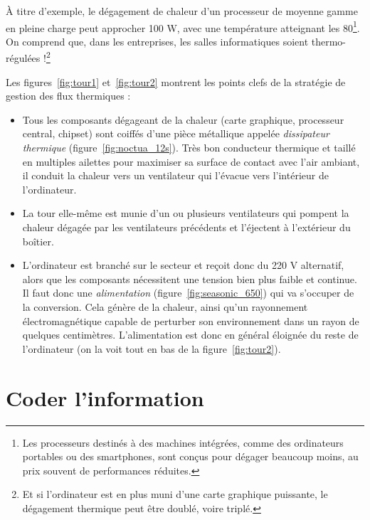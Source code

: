 À titre d'exemple, le dégagement de chaleur d'un processeur de moyenne gamme en pleine charge peut approcher 100 W, avec une température atteignant les 80\degre\footnote{Les processeurs destinés à des machines intégrées, comme des ordinateurs portables ou des smartphones, sont conçus pour dégager beaucoup moins, au prix souvent de performances réduites.}. On comprend que, dans les entreprises, les salles informatiques soient thermo-régulées !\footnote{Et si l'ordinateur est en plus muni d'une carte graphique puissante, le dégagement thermique peut être doublé, voire triplé.}

Les figures~\ref{fig:tour1} et~\ref{fig:tour2} montrent les points clefs de la stratégie de gestion des flux thermiques :
\begin{itemize}
	\item Tous les composants dégageant de la chaleur (carte graphique, processeur central, chipset) sont coiffés d'une pièce métallique appelée \emph{dissipateur thermique} (figure~\ref{fig:noctua_12s}). Très bon conducteur thermique et taillé en multiples ailettes pour maximiser sa surface de contact avec l'air ambiant, il conduit la chaleur vers un ventilateur qui l'évacue vers l'intérieur de l'ordinateur.
	\item La tour elle-même est munie d'un ou plusieurs ventilateurs qui pompent la chaleur dégagée par les ventilateurs précédents et l'éjectent à l'extérieur du boîtier.	\item L'ordinateur est branché sur le secteur et reçoit donc du 220 V alternatif, alors que les composants nécessitent une tension bien plus faible et continue. Il faut donc une \emph{alimentation} (figure~\ref{fig:seasonic_650}) qui va s'occuper de la conversion. Cela génère de la chaleur, ainsi qu'un rayonnement électromagnétique capable de perturber son environnement dans un rayon de quelques centimètres. L'alimentation est donc en général éloignée du reste de l'ordinateur (on la voit tout en bas de la figure~\ref{fig:tour2}).
\end{itemize}
\section{Coder l'information}
